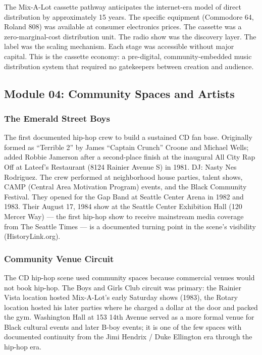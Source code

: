 \documentclass[11pt,letterpaper]{article}
\begin{document}
The Mix-A-Lot cassette pathway anticipates the internet-era model of direct distribution by approximately 15 years. The specific equipment (Commodore 64, Roland 808) was available at consumer electronics prices. The cassette was a zero-marginal-cost distribution unit. The radio show was the discovery layer. The label was the scaling mechanism. Each stage was accessible without major capital. This is the cassette economy: a pre-digital, community-embedded music distribution system that required no gatekeepers between creation and audience.

\subsection{Module 04: Community Spaces and Artists}

\subsubsection{The Emerald Street Boys}

The first documented hip-hop crew to build a sustained CD fan base. Originally formed as ``Terrible 2'' by James ``Captain Crunch'' Croone and Michael Wells; added Robbie Jamerson after a second-place finish at the inaugural All City Rap Off at Lateef's Restaurant (8124 Rainier Avenue S) in 1981. DJ: Nasty Nes Rodriguez. The crew performed at neighborhood house parties, talent shows, CAMP (Central Area Motivation Program) events, and the Black Community Festival. They opened for the Gap Band at Seattle Center Arena in 1982 and 1983. Their August 17, 1984 show at the Seattle Center Exhibition Hall (120 Mercer Way) --- the first hip-hop show to receive mainstream media coverage from The Seattle Times --- is a documented turning point in the scene's visibility (HistoryLink.org).

\subsubsection{Community Venue Circuit}

The CD hip-hop scene used community spaces because commercial venues would not book hip-hop. The Boys and Girls Club circuit was primary: the Rainier Vista location hosted Mix-A-Lot's early Saturday shows (1983), the Rotary location hosted his later parties where he charged a dollar at the door and packed the gym. Washington Hall at 153 14th Avenue served as a more formal venue for Black cultural events and later B-boy events; it is one of the few spaces with documented continuity from the Jimi Hendrix / Duke Ellington era through the hip-hop era.
\end{document}
